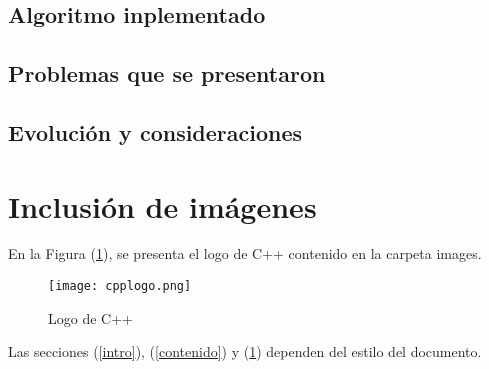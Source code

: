 \documentclass{article}
\begin{document}
\subsection{Algoritmo inplementado}

\subsection{Problemas que se presentaron}

\subsection{Evolución y consideraciones}

\section{Inclusión de imágenes} \label{imagenes}

En la Figura (\ref{fig:cpplogo}), se presenta el logo de C++ contenido en la carpeta images.

\begin{figure}[h]
\texttt{[image: cpplogo.png]}
\centering
\caption{Logo de C++}
\label{fig:cpplogo}
\end{figure}

Las secciones (\ref{intro}), (\ref{contenido}) y (\ref{imagenes}) dependen del estilo del documento.



\end{document}
